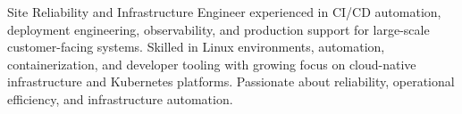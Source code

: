 
\begin{cvparagraph}
Site Reliability and Infrastructure Engineer experienced in CI/CD automation, deployment engineering, observability, and production support for large-scale customer-facing systems. Skilled in Linux environments, automation, containerization, and developer tooling with growing focus on cloud-native infrastructure and Kubernetes platforms. Passionate about reliability, operational efficiency, and infrastructure automation.
\end{cvparagraph}
